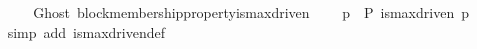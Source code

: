 \begin{isabellebody}
\ \ \isanewline
\ \ \isamarkupfalse%
%
\endisatagproof
{\isafoldproof}%
%
\isadelimproof
\isanewline
%
\endisadelimproof
\isanewline
{}\isamarkupfalse%
\ {\isacharparenleft}\ Ghost{\isacharparenright}\ block{\isacharunderscore}membership{\isacharunderscore}property{\isacharunderscore}is{\isacharunderscore}max{\isacharunderscore}driven\ {\isacharcolon}\isanewline
\ \ {\isachardoublequoteopen}{\isasymforall}\ p\ {\isasymin}\ P{\isachardot}\ is{\isacharunderscore}max{\isacharunderscore}driven\ p{\isachardoublequoteclose}\isanewline
%
\isadelimproof
\ \ %
\endisadelimproof
%
\isatagproof
{}\isamarkupfalse%
\ {\isacharparenleft}simp\ add{\isacharcolon}\ is{\isacharunderscore}max{\isacharunderscore}driven{\isacharunderscore}def{\isacharparenright}\isanewline
\ \ \isanewline
\ \ \isanewline
\ \ \isamarkupfalse%
%
\endisatagproof
{\isafoldproof}%
%
\isadelimproof
\isanewline
%
\endisadelimproof
%
\isadelimtheory
\isanewline
%
\endisadelimtheory
%
\isatagtheory
{}\isamarkupfalse%
%
\endisatagtheory
{\isafoldtheory}%
%
\isadelimtheory
%
\endisadelimtheory
%
\end{isabellebody}%
\endinput
